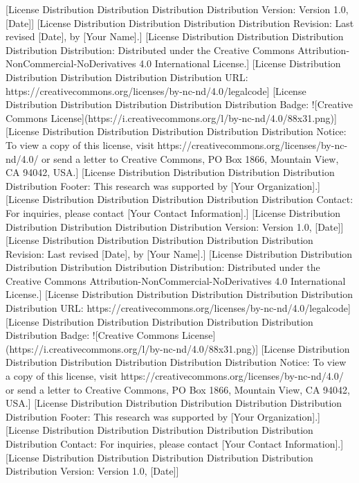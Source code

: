 [License Distribution Distribution Distribution Distribution Version: Version 1.0, [Date]]  
[License Distribution Distribution Distribution Distribution Revision: Last revised [Date], by [Your Name].]  
[License Distribution Distribution Distribution Distribution Distribution: Distributed under the Creative Commons Attribution-NonCommercial-NoDerivatives 4.0 International License.]  
[License Distribution Distribution Distribution Distribution Distribution URL: https://creativecommons.org/licenses/by-nc-nd/4.0/legalcode]  
[License Distribution Distribution Distribution Distribution Distribution Badge: ![Creative Commons License](https://i.creativecommons.org/l/by-nc-nd/4.0/88x31.png)]  
[License Distribution Distribution Distribution Distribution Distribution Notice: To view a copy of this license, visit https://creativecommons.org/licenses/by-nc-nd/4.0/ or send a letter to Creative Commons, PO Box 1866, Mountain View, CA 94042, USA.]  
[License Distribution Distribution Distribution Distribution Distribution Footer: This research was supported by [Your Organization].]  
[License Distribution Distribution Distribution Distribution Distribution Contact: For inquiries, please contact [Your Contact Information].]  
[License Distribution Distribution Distribution Distribution Distribution Version: Version 1.0, [Date]]  
[License Distribution Distribution Distribution Distribution Distribution Revision: Last revised [Date], by [Your Name].]  
[License Distribution Distribution Distribution Distribution Distribution Distribution: Distributed under the Creative Commons Attribution-NonCommercial-NoDerivatives 4.0 International License.]  
[License Distribution Distribution Distribution Distribution Distribution Distribution URL: https://creativecommons.org/licenses/by-nc-nd/4.0/legalcode]  
[License Distribution Distribution Distribution Distribution Distribution Distribution Badge: ![Creative Commons License](https://i.creativecommons.org/l/by-nc-nd/4.0/88x31.png)]  
[License Distribution Distribution Distribution Distribution Distribution Distribution Notice: To view a copy of this license, visit https://creativecommons.org/licenses/by-nc-nd/4.0/ or send a letter to Creative Commons, PO Box 1866, Mountain View, CA 94042, USA.]  
[License Distribution Distribution Distribution Distribution Distribution Distribution Footer: This research was supported by [Your Organization].]  
[License Distribution Distribution Distribution Distribution Distribution Distribution Contact: For inquiries, please contact [Your Contact Information].]  
[License Distribution Distribution Distribution Distribution Distribution Distribution Version: Version 1.0, [Date]]  
